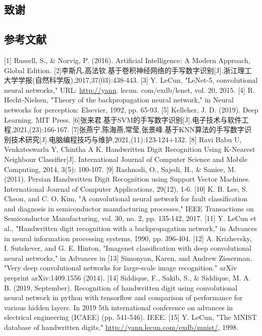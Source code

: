 \documentclass[11pt]{article}
\begin{document}
\subsection{致谢}
\label{sec:org83914a4}
\subsection{参考文献}
\label{sec:orge726e96}
[1] Russell, S., \& Norvig, P. (2016). Artificial Intelligence: A Modern Approach, Global Edition.
[2]李斯凡,高法钦.基于卷积神经网络的手写数字识别[J].浙江理工大学学报(自然科学版),2017,37(03):438-443.
[3]  Y. LeCun, "LeNet-5, convolutional neural networks," URL:  \url{http://yann}. lecun. com/exdb/lenet, vol. 20, 2015.  
[4] R. Hecht-Nielsen, "Theory of the backpropagation neural  network," in Neural networks for perception: Elsevier, 1992, pp.  65-93.
[5] Kelleher, J. D. (2019). Deep Learning. MIT Press.
[6]张来君.基于SVM的手写数字识别[J].电子技术与软件工程,2021,(23):166-167.
[7]张燕宁,陈海燕,常莹,张景峰.基于KNN算法的手写数字识别技术研究[J].电脑编程技巧与维护,2021,(11):123-124+132.
[8] Ravi Babu U, Venkateswarlu Y, Chintha A K. Handwritten Digit Recognition Using K-Nearest Neighbour Classifier[J]. International Journal of Computer Science and Mobile Computing, 2014, 3(5): 100-107.
[9] Rashnodi, O., Sajedi, H., \& Saniee, M. (2011). Persian Handwritten Digit Recognition using Support Vector Machines. International Journal of Computer Applications, 29(12), 1-6.
[10] K. B. Lee, S. Cheon, and C. O. Kim, "A convolutional neural  network for fault classification and diagnosis in semiconductor  manufacturing processes," IEEE Transactions on Semiconductor  Manufacturing, vol. 30, no. 2, pp. 135-142, 2017.
[11] Y. LeCun et al., "Handwritten digit recognition with a backpropagation network," in Advances in neural information  processing systems, 1990, pp. 396-404.
[12]  A. Krizhevsky, I. Sutskever, and G. E. Hinton, "Imagenet  classification with deep convolutional neural networks," in  Advances in
[13] Simonyan, Karen, and Andrew Zisserman. "Very deep convolutional networks for large-scale image recognition." arXiv preprint arXiv:1409.1556 (2014).
[14] Siddique, F., Sakib, S., \& Siddique, M. A. B. (2019, September). Recognition of handwritten digit using convolutional neural network in python with tensorflow and comparison of performance for various hidden layers. In 2019 5th international conference on advances in electrical engineering (ICAEE) (pp. 541-546). IEEE.
[15]  Y. LeCun, "The MNIST database of handwritten digits,"  \url{http://yann.lecun.com/exdb/mnist/}, 1998.
\end{document}
